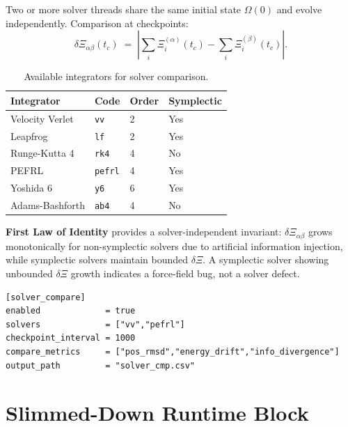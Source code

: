\documentclass[11pt,a4paper]{article}
\newcommand{\Rec}{\Xi}
\begin{document}
Two or more solver threads share the same initial state $\Omega(0)$ and evolve
independently.  Comparison at checkpoints:
\[
  \delta\Rec_{\alpha\beta}(t_c) \;=\;
  \left|
    \sum_i \Rec_i^{(\alpha)}(t_c) - \sum_i \Rec_i^{(\beta)}(t_c)
  \right| .
\]

\begin{table}[H]
\centering
\caption{Available integrators for solver comparison.}
\label{tab:solvers}
\begin{tabular}{@{}llll@{}}
\toprule
Integrator & Code & Order & Symplectic \\
\midrule
Velocity Verlet  & \texttt{vv}    & 2 & Yes \\
Leapfrog         & \texttt{lf}    & 2 & Yes \\
Runge-Kutta 4    & \texttt{rk4}   & 4 & No \\
PEFRL            & \texttt{pefrl} & 4 & Yes \\
Yoshida 6        & \texttt{y6}    & 6 & Yes \\
Adams-Bashforth  & \texttt{ab4}   & 4 & No \\
\bottomrule
\end{tabular}
\end{table}

\begin{smlaw}
\textbf{First Law of Identity} provides a solver-independent invariant:
$\delta\Rec_{\alpha\beta}$ grows monotonically for non-symplectic solvers
due to artificial information injection, while symplectic solvers maintain
bounded $\delta\Rec$.  A symplectic solver showing unbounded $\delta\Rec$
growth indicates a force-field bug, not a solver defect.
\end{smlaw}

\begin{lstlisting}[language={}, caption={Solver comparison configuration block.}]
[solver_compare]
enabled             = true
solvers             = ["vv","pefrl"]
checkpoint_interval = 1000
compare_metrics     = ["pos_rmsd","energy_drift","info_divergence"]
output_path         = "solver_cmp.csv"
\end{lstlisting}

\section{Slimmed-Down Runtime Block}\label{sec:runtime}
\end{document}
